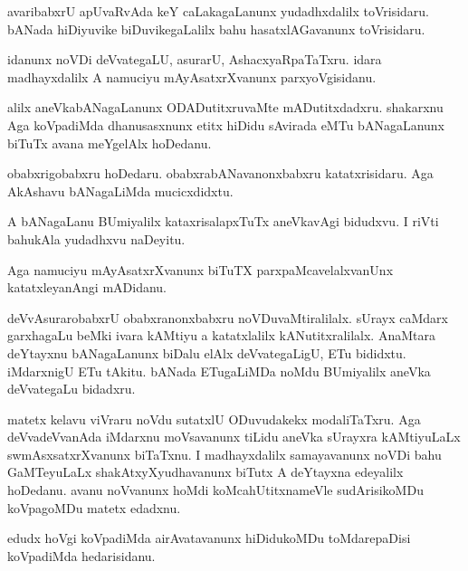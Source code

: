 \documentclass{article}
\begin{document}
\begin{mng}%
avaribabxrU apUvaRvAda keY caLakagaLanunx yudadhxdalilx toVrisidaru. bANada hiDiyuvike 
biDuvikegaLalilx bahu hasatxlAGavanunx toVrisidaru.
\end{mng}

\begin{mng}%
idanunx noVDi deVvategaLU, asurarU, AshacxyaRpaTaTxru. idara madhayxdalilx A namuciyu 
mAyAsatxrXvanunx parxyoVgisidanu.
\end{mng}

\begin{mng}%
alilx aneVkabANagaLanunx ODADutitxruvaMte mADutitxdadxru. shakarxnu Aga koVpadiMda dhanusasxnunx 
etitx hiDidu sAvirada eMTu bANagaLanunx biTuTx avana meYgelAlx hoDedanu.
\end{mng}

\begin{mng}%
obabxrigobabxru hoDedaru. obabxrabANavanonxbabxru katatxrisidaru. Aga AkAshavu bANagaLiMda 
mucicxdidxtu.
\end{mng}

\begin{mng}%
A bANagaLanu BUmiyalilx kataxrisalapxTuTx aneVkavAgi bidudxvu. I riVti bahukAla yudadhxvu naDeyitu.
\end{mng}

\begin{mng}%
Aga namuciyu mAyAsatxrXvanunx biTuTX parxpaMcavelalxvanUnx katatxleyanAngi mADidanu.
\end{mng}

\begin{mng}%
deVvAsurarobabxrU obabxranonxbabxru noVDuvaMtiralilalx. sUrayx caMdarx garxhagaLu beMki ivara 
kAMtiyu a katatxlalilx kANutitxralilalx. AnaMtara deYtayxnu bANagaLanunx biDalu elAlx 
deVvategaLigU, ETu bididxtu. iMdarxnigU ETu tAkitu. bANada ETugaLiMDa noMdu BUmiyalilx aneVka 
deVvategaLu bidadxru.
\end{mng}

\begin{mng}%
matetx kelavu viVraru noVdu sutatxlU ODuvudakekx modaliTaTxru. Aga deVvadeVvanAda iMdarxnu 
moVsavanunx tiLidu aneVka sUrayxra kAMtiyuLaLx swmAsxsatxrXvanunx biTaTxnu. I madhayxdalilx 
samayavanunx noVDi bahu GaMTeyuLaLx shakAtxyXyudhavanunx biTutx A deYtayxna edeyalilx hoDedanu. 
avanu noVvanunx hoMdi koMcahUtitxnameVle sudArisikoMDu koVpagoMDu matetx edadxnu.
\end{mng}

\begin{mng}%
edudx hoVgi koVpadiMda airAvatavanunx hiDidukoMDu toMdarepaDisi koVpadiMda hedarisidanu.
\end{mng}
\end{document}
